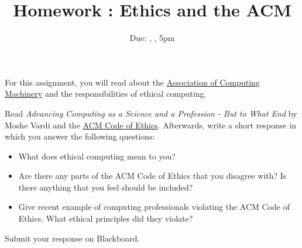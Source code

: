 \documentclass[12pt]{article}
\title{Homework \hwno: Ethics and the ACM}
\date{Due: \dayofweekname{\duedate}{\duemonth}{\year}, \monthname[\duemonth] \duedate, 5pm}
\begin{document}
\maketitle

For this assignment, you will read about the \href{https://en.wikipedia.org/wiki/Association_for_Computing_Machinery}{Association of Computing Machinery} and the responsibilities of ethical computing.

Read \emph{Advancing Computing as a Science and a Profession - But to What End} by Moshe Vardi and the \href{https://www.acm.org/code-of-ethics}{ACM Code of Ethics}.
Afterwards, write a short response in which you answer the following questions:

\begin{itemize}
	\item What does ethical computing mean to you?
	\item Are there any parts of the ACM Code of Ethics that you disagree with?  Is there anything that you feel should be included?
	\item Give recent example of computing professionals violating the ACM Code of Ethics.  What ethical principles did they violate?
\end{itemize}

Submit your response on Blackboard.
\end{document}
